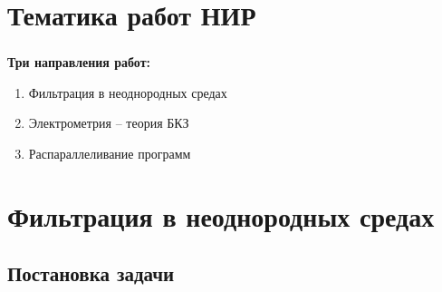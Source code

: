 

\frame[plain]{\titlepage} %


\section{Тематика работ НИР}

\begin{frame}
\frametitle{\insertsection}

\textbf{Три направления работ:}
\begin{enumerate}
    \item Фильтрация в неоднородных средах
    \item Электрометрия -- теория БКЗ
    \item Распараллеливание программ %
\end{enumerate}
\end{frame}


\section{Фильтрация в неоднородных средах}


\subsection{Постановка задачи}


